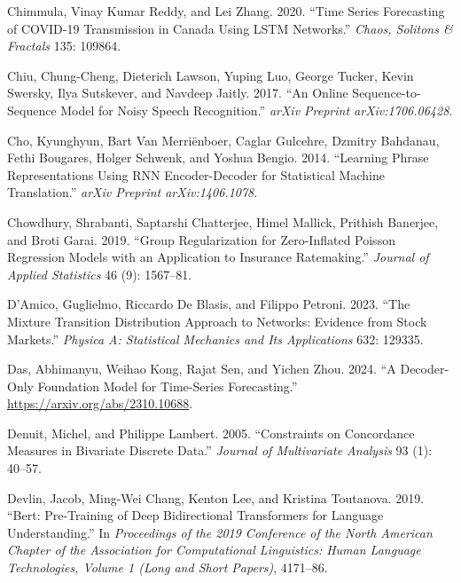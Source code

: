 \documentclass[
  letterpaper,
  double,
  12pt,
  1.0in]{beavtex}
\newlength{\cslhangindent}
\newenvironment{CSLReferences}[2] %
 {\begin{list}{}{%
  \setlength{\itemindent}{0pt}
  \setlength{\leftmargin}{0pt}
  \setlength{\parsep}{0pt}
  \ifodd #1
   \setlength{\leftmargin}{\cslhangindent}
   \setlength{\itemindent}{-1\cslhangindent}
  \fi
  \setlength{\itemsep}{#2\baselineskip}}}
 {\end{list}}
\begin{document}
\begin{CSLReferences}{1}{0}
Chimmula, Vinay Kumar Reddy, and Lei Zhang. 2020. {``Time Series
Forecasting of COVID-19 Transmission in Canada Using LSTM Networks.''}
\emph{Chaos, Solitons \& Fractals} 135: 109864.

Chiu, Chung-Cheng, Dieterich Lawson, Yuping Luo, George Tucker, Kevin
Swersky, Ilya Sutskever, and Navdeep Jaitly. 2017. {``An Online
Sequence-to-Sequence Model for Noisy Speech Recognition.''} \emph{arXiv
Preprint arXiv:1706.06428}.

Cho, Kyunghyun, Bart Van Merriënboer, Caglar Gulcehre, Dzmitry Bahdanau,
Fethi Bougares, Holger Schwenk, and Yoshua Bengio. 2014. {``Learning
Phrase Representations Using RNN Encoder-Decoder for Statistical Machine
Translation.''} \emph{arXiv Preprint arXiv:1406.1078}.

Chowdhury, Shrabanti, Saptarshi Chatterjee, Himel Mallick, Prithish
Banerjee, and Broti Garai. 2019. {``Group Regularization for
Zero-Inflated Poisson Regression Models with an Application to Insurance
Ratemaking.''} \emph{Journal of Applied Statistics} 46 (9): 1567--81.

D'Amico, Guglielmo, Riccardo De Blasis, and Filippo Petroni. 2023.
{``The Mixture Transition Distribution Approach to Networks: Evidence
from Stock Markets.''} \emph{Physica A: Statistical Mechanics and Its
Applications} 632: 129335.

Das, Abhimanyu, Weihao Kong, Rajat Sen, and Yichen Zhou. 2024. {``A
Decoder-Only Foundation Model for Time-Series Forecasting.''}
\url{https://arxiv.org/abs/2310.10688}.

Denuit, Michel, and Philippe Lambert. 2005. {``Constraints on
Concordance Measures in Bivariate Discrete Data.''} \emph{Journal of
Multivariate Analysis} 93 (1): 40--57.

Devlin, Jacob, Ming-Wei Chang, Kenton Lee, and Kristina Toutanova. 2019.
{``Bert: Pre-Training of Deep Bidirectional Transformers for Language
Understanding.''} In \emph{Proceedings of the 2019 Conference of the
North American Chapter of the Association for Computational Linguistics:
Human Language Technologies, Volume 1 (Long and Short Papers)},
4171--86.


\end{CSLReferences}
\end{document}
